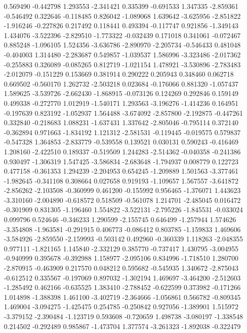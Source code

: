 0.569490
-0.442798
1.293553
-2.341421
0.335399
-0.691533
1.347335
-2.859361
-0.546492
0.322646
-0.118485
0.826042
-1.089068
1.639642
-3.625956
-2.851822
-1.916246
-0.227826
0.217492
0.118441
0.493394
-0.117747
0.921856
-1.349143
1.434076
-3.522396
-2.829510
-1.773322
-0.032439
0.171018
0.341061
-0.072467
0.885248
-1.096105
1.524356
-3.636786
-2.890970
-2.205734
-0.546433
0.481048
-0.404003
1.314480
-2.283687
0.549857
-1.039537
1.586996
-3.323486
-2.017362
-0.255883
0.326089
-0.085265
0.812719
-1.021154
1.478921
-3.530896
-2.783483
-2.012079
-0.151229
0.153669
0.381914
0.290222
0.205943
0.348460
0.062718
0.669502
-0.560170
1.262732
-2.503218
0.023684
-0.176066
0.881320
-1.057437
1.589625
-3.539726
-2.662430
-1.868915
-0.073126
0.124269
0.292846
0.159149
0.499338
-0.272770
1.012919
-1.540171
1.293563
-3.196276
-1.414236
0.164951
-0.197639
0.823192
-1.052937
1.564488
-3.674092
-2.857800
-2.192875
-0.447261
0.332840
-0.218683
1.088231
-1.637431
1.337642
-2.805046
-0.795114
0.372140
-0.362894
0.971663
-1.834192
1.121312
-2.581531
-0.119445
-0.019575
0.579837
-0.547328
1.364853
-2.833779
-0.539558
0.139521
0.030131
0.590243
-0.416469
1.208160
-2.422510
0.189337
-0.519509
1.244283
-2.514362
-0.040358
-0.241386
0.930497
-1.306319
1.547425
-3.586834
-2.683648
-1.794937
0.008779
0.122723
0.477158
-0.361353
1.294239
-2.204953
0.654245
-1.209889
1.501563
-3.377461
-1.982645
-0.341108
0.308664
0.027658
0.919193
-1.109657
1.567557
-3.641872
-2.856262
-2.103508
-0.360999
0.461200
-0.155992
0.956465
-1.376071
1.443623
-3.310160
-2.004890
-0.618572
0.518509
-0.561078
1.214701
-2.485045
0.016472
-0.301909
0.831305
-1.196460
1.554822
-3.522131
-2.795226
-1.845531
-0.033024
0.099796
0.524646
-0.346233
1.290599
-2.155745
0.646499
-1.257944
1.574626
-3.354808
-1.963581
-0.291915
0.406773
-0.086412
0.803785
-1.159833
1.469606
-3.584926
-2.859550
-2.159993
-0.503142
0.492960
-0.360339
1.118263
-2.048355
0.977111
-1.821165
1.145840
-2.332129
0.385770
-0.737417
1.430795
-3.004955
-0.940999
0.395678
-0.392988
1.158977
-2.095106
0.834996
-1.718510
1.280700
-2.870915
-0.463909
0.217570
0.048212
0.595682
-0.545935
1.340672
-2.875043
-0.612512
0.335567
-0.197069
0.897032
-1.302194
1.469697
-3.464200
-2.512603
-1.285492
0.462166
-0.635525
1.383410
-2.788452
-0.622599
0.373982
-0.171266
1.014898
-1.388398
1.461100
-3.402719
-2.364666
-1.056861
0.566782
-0.809345
1.469004
-3.094275
-1.425475
0.254785
-0.250842
0.927056
-1.389901
1.515972
-3.379152
-2.390484
-1.123719
0.593608
-0.720659
1.498738
-3.080197
-1.338548
0.214502
-0.292489
0.985867
-1.473704
1.377574
-3.261323
-1.892038
-0.322479
